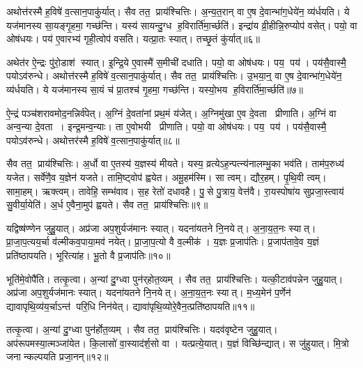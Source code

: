 अथोत्त॑रस्मै ह॒विषे॑ व॒त्सान॒पाकु॑र्यात्।
सैव तत॒ प्राय॑श्चित्तिः।
अ॒न्य॒त॒रान् वा ए॒ष दे॒वान्भा॑ग॒धेये॑न॒ व्य॑र्धयति।
ये यज॑मानस्य सा॒यङ्गृ॒हमा॒ गच्छ॑न्ति।
यस्य॑ सायन्दु॒ग्ध ह॒विरार्ति॑मा॒र्च्छति॑।
इन्द्रा॑य व्री॒हीन्नि॒रुप्योप॑ वसेत्।
पयो॒ वा ओष॑धयः।
पय॑ ए॒वारभ्य॑ गृही॒त्वोप॑ वसति।
यत्प्रा॒तः स्यात्।
तच्छृ॒तं कु॑र्यात्॥६॥

अथेत॑र ऐ॒न्द्रः पु॑रो॒डाश॑ स्यात्।
इ॒न्द्रि॒ये ए॒वास्मै॑ स॒मीची॑ दधाति।
पयो॒ वा ओष॑धयः।
पय॒ पय॑।
पय॑सै॒वास्मै॒ पयोऽव॑रुन्धे।
अथोत्त॑रस्मै ह॒विषे॑ व॒त्सान॒पाकु॑र्यात्।
सैव तत॒ प्राय॑श्चित्तिः।
उ॒भया॒न्॒ वा ए॒ष दे॒वान्भा॑ग॒धेये॑न॒ व्य॑र्धयति।
ये यज॑मानस्य सा॒यं च॑ प्रा॒तश्च॑ गृ॒हमा॒ गच्छ॑न्ति।
यस्यो॒भय ह॒विरार्ति॑मा॒र्च्छति॑॥७॥

ऐ॒न्द्रं पञ्च॑शरावमोद॒नन्निर्व॑पेत्।
अ॒ग्निं दे॒वता॑नां प्रथ॒मं य॑जेत्।
अ॒ग्निमु॑खा ए॒व दे॒वता प्रीणाति।
अ॒ग्निं वा अन्व॒न्या दे॒वता।
इन्द्र॒मन्व॒न्याः।
ता ए॒वोभयी प्रीणाति।
पयो॒ वा ओष॑धयः।
पय॒ पय॑।
पय॑सै॒वास्मै॒ पयोऽव॑रुन्धे।
अथोत्तर॑स्मै ह॒विषे॑ व॒त्सान॒पाकु॑र्यात्॥८॥

सैव तत॒ प्राय॑श्चित्तिः।
अ॒र्धो वा ए॒तस्य॑ य॒ज्ञस्य॑ मीयते।
यस्य॒ व्रत्येऽह॒न्पत्न्य॑नालम्भु॒का भव॑ति।
ताम॑प॒रुध्य॑ यजेत।
सर्वे॑णै॒व य॒ज्ञेन॑ यजते।
तामि॒ष्ट्वोप॑ ह्वयेत।
अमू॒हम॑स्मि।
सा त्वम्।
द्यौर॒हम्।
पृ॒थि॒वी त्वम्।
सामा॒हम्।
ऋक्त्वम्।
तावेहि॒ सम्भ॑वाव।
स॒ह रेतो॑ दधावहै।
पु॒से पु॒त्राय॒ वेत्त॑वै।
रा॒यस्पोषा॑य सुप्रजा॒स्त्वाय॑ सु॒वीर्या॒येति॑।
अ॒र्ध ए॒वैना॒मुप॑ ह्वयते।
सैव तत॒ प्राय॑श्चित्तिः॥९॥\anuvakamend[द॒धा॒ति॒ य॒ज्ञ उ॑त॒ एक॒न्धय॑न्ति रुन्धे कुर्यादा॒र्च्छत्य॒पाकु॑र्यात्पृथि॒वी त्वम॒ष्टौ च॑ (सर्वा॒न्॒ वि वै यदि॑ परस्त॒रामोष॑धीरन्यत॒रानु॒भया॑न॒र्धो वै ॥ )]

यद्विष्ष॑ण्णेन जुहु॒यात्।
अप्र॑जा अप॒शुर्यज॑मानः स्यात्।
यदना॑यतने नि॒नयेत्।
अ॒ना॒य॒त॒नः स्यात्।
प्रा॒जा॒प॒त्यय॒र्चा व॑ल्मीकव॒पाया॒मव॑ नयेत्।
प्रा॒जा॒प॒त्यो वै व॒ल्मीक॑।
य॒ज्ञः प्र॒जाप॑तिः।
प्र॒जाप॑तावे॒व य॒ज्ञं प्रति॑ष्ठापयति।
भूरित्या॑ह।
भू॒तो वै प्र॒जाप॑तिः॥१०॥

भूति॑मे॒वोपै॑ति।
तत्कृ॒त्वा।
अ॒न्यां दु॒ग्ध्वा पुन॑र्‌होत॒व्यम्।
सैव तत॒ प्राय॑श्चित्तिः।
यत्की॒टाव॑पन्नेन जुहु॒यात्।
अप्र॑जा अप॒शुर्यज॑मानः स्यात्।
यदना॑यतने नि॒नयेत्।
अ॒ना॒य॒त॒नः स्यात्।
म॒ध्य॒मेन॑ प॒र्णेन॑ द्यावापृथि॒व्य॑य॒र्चाऽन्त॑ परि॒धि निन॑येत्।
द्यावा॑पृथि॒व्योरे॒वैन॒त्प्रति॑ष्ठापयति॥११॥

तत्कृ॒त्वा।
अ॒न्यां दु॒ग्ध्वा पुन॑र्\mbox{}होत॒व्यम्।
सैव तत॒ प्राय॑श्चित्तिः।
यदव॑वृष्टेन जुहु॒यात्।
अप॑रूपमस्या॒त्मञ्जा॑येत।
कि॒लासो॑ वा॒स्याद॑र्\mbox{}श॒सो वा।
यत्प्रत्ये॒यात्।
य॒ज्ञं विच्छि॑न्द्यात्।
स जु॑हुयात्।
मि॒त्रो जनान्कल्पयति प्रजा॒नन्॥१२॥

